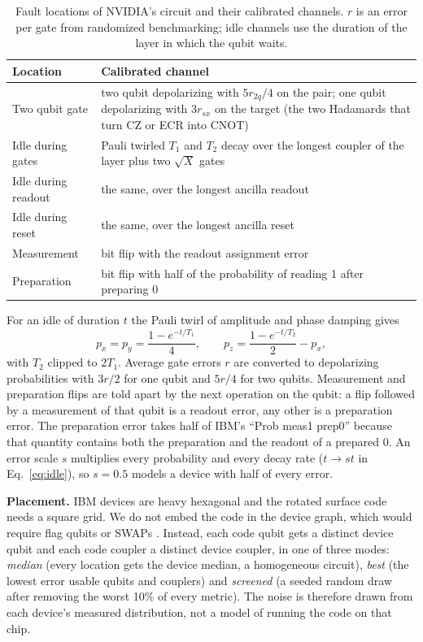\begin{table}[t]
\caption{Fault locations of NVIDIA's circuit and their calibrated channels. $r$ is an error per gate from randomized
benchmarking; idle channels use the duration of the layer in which the qubit waits.}\label{tab:noise}
\centering
\begin{tabular}{p{3.2cm}p{8.3cm}}
\toprule
Location & Calibrated channel \\
\midrule
Two qubit gate & two qubit depolarizing with $5r_{2q}/4$ on the pair; one qubit depolarizing with $3r_{sx}$ on the
target (the two Hadamards that turn CZ or ECR into CNOT) \\
Idle during gates & Pauli twirled $T_1$ and $T_2$ decay over the longest coupler of the layer plus two $\sqrt{X}$ gates \\
Idle during readout & the same, over the longest ancilla readout \\
Idle during reset & the same, over the longest ancilla reset \\
Measurement & bit flip with the readout assignment error \\
Preparation & bit flip with half of the probability of reading 1 after preparing 0 \\
\bottomrule
\end{tabular}
\end{table}

For an idle of duration $t$ the Pauli twirl of amplitude and phase damping \cite{ghosh2012decoherence} gives
\begin{equation}
p_x = p_y = \frac{1 - e^{-t/T_1}}{4}, \qquad p_z = \frac{1 - e^{-t/T_2}}{2} - p_x, \label{eq:idle}
\end{equation}
with $T_2$ clipped to $2T_1$. Average gate errors $r$ are converted to depolarizing probabilities with $3r/2$ for one
qubit and $5r/4$ for two qubits. Measurement and preparation flips are told apart by the next operation on the qubit:
a flip followed by a measurement of that qubit is a readout error, any other is a preparation error. The preparation
error takes half of IBM's ``Prob meas1 prep0'' because that quantity contains both the preparation and the readout of
a prepared 0. An error scale $s$ multiplies every probability and every decay rate ($t \to st$ in
Eq.~\ref{eq:idle}), so $s = 0.5$ models a device with half of every error.

\textbf{Placement.} IBM devices are heavy hexagonal and the rotated surface code needs a square grid. We do not embed
the code in the device graph, which would require flag qubits or SWAPs \cite{chamberland2020heavyhex}. Instead, each
code qubit gets a distinct device qubit and each code coupler a distinct device coupler, in one of three modes:
\emph{median} (every location gets the device median, a homogeneous circuit), \emph{best} (the lowest error usable
qubits and couplers) and \emph{screened} (a seeded random draw after removing the worst 10\% of every metric). The
noise is therefore drawn from each device's measured distribution, not a model of running the code on that chip.

